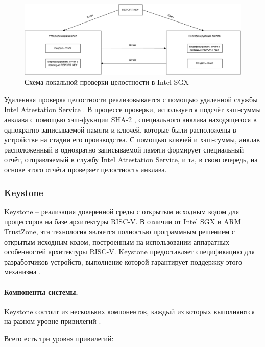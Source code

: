 \begin{figure}[h]
	\centering
	\includegraphics[width=\textwidth]{img/enclave-local-attestation.pdf}
	\caption{Схема локальной проверки целостности в Intel SGX}
	\label{fig:enclave-local-attestation}
\end{figure}

Удаленная проверка целостности реализовывается с помощью удаленной службы Intel Attestation Service \cite{intel-attestation-service}. В процессе проверки, используется подсчёт хэш-суммы анклава с помощью хэш-фукнции SHA-2 \cite{sha2}, специального анклава находящегося в однократно записываемой памяти и ключей, которые были расположены в устройстве на стадии его производства. С помощью ключей и хэш-суммы, анклав расположенный в однократно записываемой памяти формирует специальный отчёт, отправляемый в службу Intel Attestation Service, и та, в свою очередь, на основе этого отчёта проверяет целостность анклава.

\subsubsection{Keystone}

Keystone -- реализация доверенной среды с открытым исходным кодом для процессоров на базе архитектуры RISC-V. В отличии от Intel SGX и ARM TrustZone, эта технология является полностью программным решением с открытым исходным кодом, построенным на использовании аппаратных особенностей архитектуры RISC-V. Keystone предоставляет спецификацию для разработчиков устройств, выполнение которой гарантирует поддержку этого механизма \cite{riscv-keystone}.

\paragraph{Компоненты системы.}

Keystone состоит из нескольких компонентов, каждый из которых выполняются на разном уровне привилегий \cite{keystone-overview}.

Всего есть три уровня привилегий:

